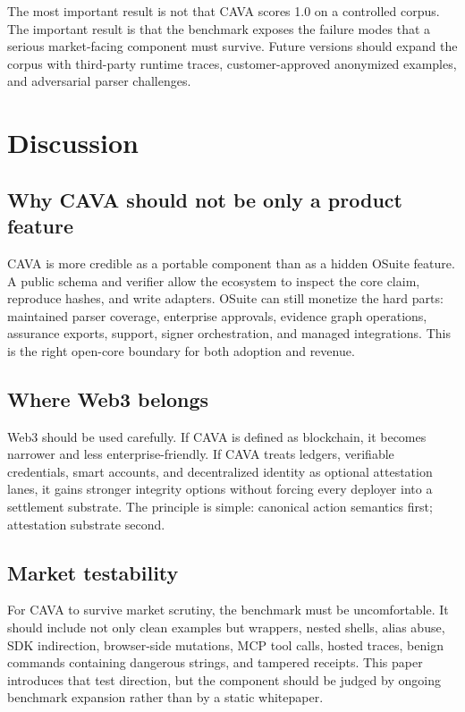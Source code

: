 \documentclass[11pt]{article}
\begin{document}
The most important result is not that CAVA scores 1.0 on a controlled corpus. The important result is that the benchmark exposes the failure modes that a serious market-facing component must survive. Future versions should expand the corpus with third-party runtime traces, customer-approved anonymized examples, and adversarial parser challenges.

\section{Discussion}

\subsection{Why CAVA should not be only a product feature}

CAVA is more credible as a portable component than as a hidden OSuite feature. A public schema and verifier allow the ecosystem to inspect the core claim, reproduce hashes, and write adapters. OSuite can still monetize the hard parts: maintained parser coverage, enterprise approvals, evidence graph operations, assurance exports, support, signer orchestration, and managed integrations. This is the right open-core boundary for both adoption and revenue.

\subsection{Where Web3 belongs}

Web3 should be used carefully. If CAVA is defined as blockchain, it becomes narrower and less enterprise-friendly. If CAVA treats ledgers, verifiable credentials, smart accounts, and decentralized identity as optional attestation lanes, it gains stronger integrity options without forcing every deployer into a settlement substrate. The principle is simple: canonical action semantics first; attestation substrate second.

\subsection{Market testability}

For CAVA to survive market scrutiny, the benchmark must be uncomfortable. It should include not only clean examples but wrappers, nested shells, alias abuse, SDK indirection, browser-side mutations, MCP tool calls, hosted traces, benign commands containing dangerous strings, and tampered receipts. This paper introduces that test direction, but the component should be judged by ongoing benchmark expansion rather than by a static whitepaper.
\end{document}
